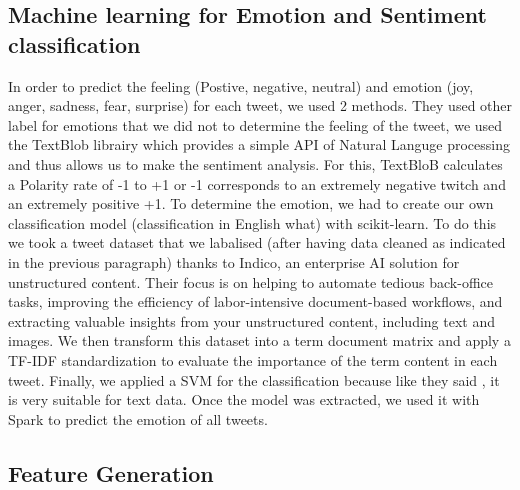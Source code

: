 \documentclass{acmtog} %
\begin{document}
\subsection{Machine learning for Emotion and Sentiment classification}
\label{subsub:ml}

In order to predict the feeling (Postive, negative, neutral) and emotion (joy, anger, sadness, fear, surprise) for each tweet, we used 2 methods. They used other label for emotions that we did not to determine the feeling of the tweet, we used the TextBlob librairy which provides a simple API of Natural Languge processing and thus allows us to make the sentiment analysis. For this, TextBloB calculates a Polarity rate of -1 to +1 or -1 corresponds to an extremely negative twitch and an extremely positive +1.
To determine the emotion, we had to create our own classification model (classification in English what) with scikit-learn.
To do this we took a tweet dataset that we labalised (after having data cleaned as indicated in the previous paragraph) thanks to Indico, an enterprise AI solution for unstructured content. Their focus is on helping to automate tedious back-office tasks, improving the efficiency of labor-intensive document-based workflows, and extracting valuable insights from your unstructured content, including text and images.  
We then transform this dataset into a term document matrix and apply a TF-IDF standardization to evaluate the importance of the term content in each tweet.
Finally, we applied a SVM for the classification because like they said \cite{Medhat14}, it is very suitable for text data.
Once the model was extracted, we used it with Spark to predict the emotion of all tweets.

\subsection{Feature Generation}
\label{subsub:featureGeneration}
\end{document}
